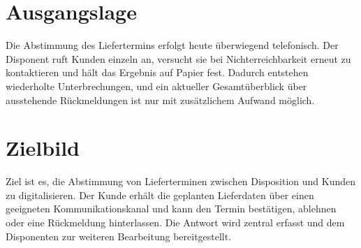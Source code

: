 \section{Ausgangslage}

Die Abstimmung des Liefertermins erfolgt heute überwiegend telefonisch. Der Disponent ruft
Kunden einzeln an, versucht sie bei Nichterreichbarkeit erneut zu kontaktieren und hält das
Ergebnis auf Papier fest. Dadurch entstehen wiederholte Unterbrechungen, und ein aktueller
Gesamtüberblick über ausstehende Rückmeldungen ist nur mit zusätzlichem Aufwand möglich.

\section{Zielbild}

Ziel ist es, die Abstimmung von Lieferterminen zwischen Disposition und Kunden zu
digitalisieren. Der Kunde erhält die geplanten Lieferdaten über einen geeigneten
Kommunikationskanal und kann den Termin bestätigen, ablehnen oder eine Rückmeldung
hinterlassen. Die Antwort wird zentral erfasst und dem Disponenten zur weiteren Bearbeitung
bereitgestellt.
